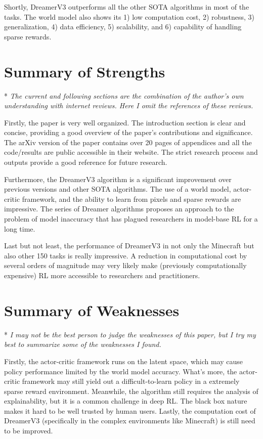 \documentclass{article}
\begin{document}
Shortly, DreamerV3 outperforms all the other SOTA algorithms in most of the tasks. The world model also shows its 1) low computation cost, 2) robustness, 3) generalization, 4) data efficiency, 5) scalability, and 6) capability of handling sparse rewards.

\section{Summary of Strengths}

* \textit{The current and following sections are the combination of the author's own understanding with internet reviews. Here I omit the references of these reviews.}

Firstly, the paper is very well organized. The introduction section is clear and concise, providing a good overview of the paper's contributions and significance. The arXiv version of the paper contains over 20 pages of appendices and all the code/results are public accessible in their website. The strict research process and outputs provide a good reference for future research.

Furthermore, the DreamerV3 algorithm is a significant improvement over previous versions and other SOTA algorithms. The use of a world model, actor-critic framework, and the ability to learn from pixels and sparse rewards are impressive. The series of Dreamer algorithms proposes an approach to the problem of model inaccuracy that has plagued researchers in model-base RL for a long time.

Last but not least, the performance of DreamerV3 in not only the Minecraft but also other 150 tasks is really impressive. A reduction in computational cost by several orders of magnitude may very likely make (previously computationally expensive) RL more accessible to researchers and practitioners.

\section{Summary of Weaknesses}

* \textit{I may not be the best person to judge the weaknesses of this paper, but I try my best to summarize some of the weaknesses I found.}

Firstly, the actor-critic framework runs on the latent space, which may cause policy performance limited by the world model accuracy. What's more, the actor-critic framework may still yield out a difficult-to-learn policy in a extremely sparse reward environment. Meanwhile, the algorithm still requires the analysis of explainability, but it is a common challenge in deep RL. The black box nature makes it hard to be well trusted by human users. Lastly, the computation cost of DreamerV3 (specifically in the complex environments like Minecraft) is still need to be improved.
\end{document}
